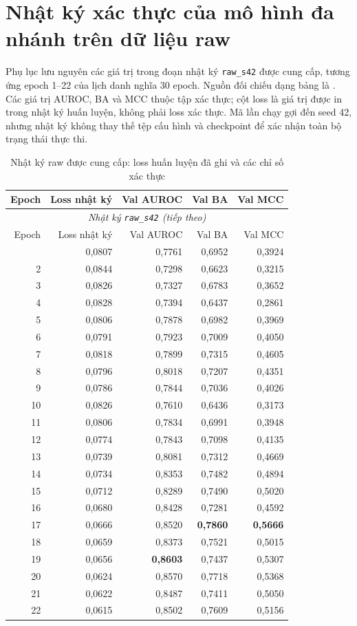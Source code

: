 \documentclass[14pt,a4paper,oneside]{extreport}
\begin{document}
\chapter{Nhật ký xác thực của mô hình đa nhánh trên dữ liệu raw}
\label{app:raw-s42-log}

Phụ lục lưu nguyên các giá trị trong đoạn nhật ký \texttt{raw\_s42}
được cung cấp, tương ứng epoch 1--22 của lịch danh nghĩa 30 epoch.
Nguồn đối chiếu dạng bảng là .
Các giá trị AUROC, BA và MCC thuộc tập xác thực; cột loss là giá trị
được in trong nhật ký huấn luyện, không phải loss xác thực. Mã lần
chạy gợi đến seed 42, nhưng nhật ký không thay thế tệp cấu hình và
checkpoint để xác nhận toàn bộ trạng thái thực thi.

\begin{longtable}{@{}rrrrr@{}}
  \caption{Nhật ký raw được cung cấp: loss huấn luyện đã ghi và các chỉ số xác thực}
  \label{tab:raw-s42-full-log}\\
  \toprule
  Epoch & Loss nhật ký & Val AUROC & Val BA & Val MCC\\
  \midrule\endfirsthead
  \multicolumn{5}{c}{\textit{Nhật ký \texttt{raw\_s42} (tiếp theo)}}\\
  \toprule
  Epoch & Loss nhật ký & Val AUROC & Val BA & Val MCC\\
  \midrule\endhead
  \bottomrule\endfoot
   1 & 0,0807 & 0,7761 & 0,6952 & 0,3924\\
   2 & 0,0844 & 0,7298 & 0,6623 & 0,3215\\
   3 & 0,0826 & 0,7327 & 0,6783 & 0,3652\\
   4 & 0,0828 & 0,7394 & 0,6437 & 0,2861\\
   5 & 0,0806 & 0,7878 & 0,6982 & 0,3969\\
   6 & 0,0791 & 0,7923 & 0,7009 & 0,4050\\
   7 & 0,0818 & 0,7899 & 0,7315 & 0,4605\\
   8 & 0,0796 & 0,8018 & 0,7207 & 0,4351\\
   9 & 0,0786 & 0,7844 & 0,7036 & 0,4026\\
  10 & 0,0826 & 0,7610 & 0,6436 & 0,3173\\
  11 & 0,0806 & 0,7834 & 0,6991 & 0,3948\\
  12 & 0,0774 & 0,7843 & 0,7098 & 0,4135\\
  13 & 0,0739 & 0,8081 & 0,7312 & 0,4669\\
  14 & 0,0734 & 0,8353 & 0,7482 & 0,4894\\
  15 & 0,0712 & 0,8289 & 0,7490 & 0,5020\\
  16 & 0,0680 & 0,8428 & 0,7281 & 0,4592\\
  17 & 0,0666 & 0,8520 & \textbf{0,7860} & \textbf{0,5666}\\
  18 & 0,0659 & 0,8373 & 0,7521 & 0,5015\\
  19 & 0,0656 & \textbf{0,8603} & 0,7437 & 0,5307\\
  20 & 0,0624 & 0,8570 & 0,7718 & 0,5368\\
  21 & 0,0622 & 0,8487 & 0,7411 & 0,5050\\
  22 & 0,0615 & 0,8502 & 0,7609 & 0,5156\\
\end{longtable}
\end{document}
